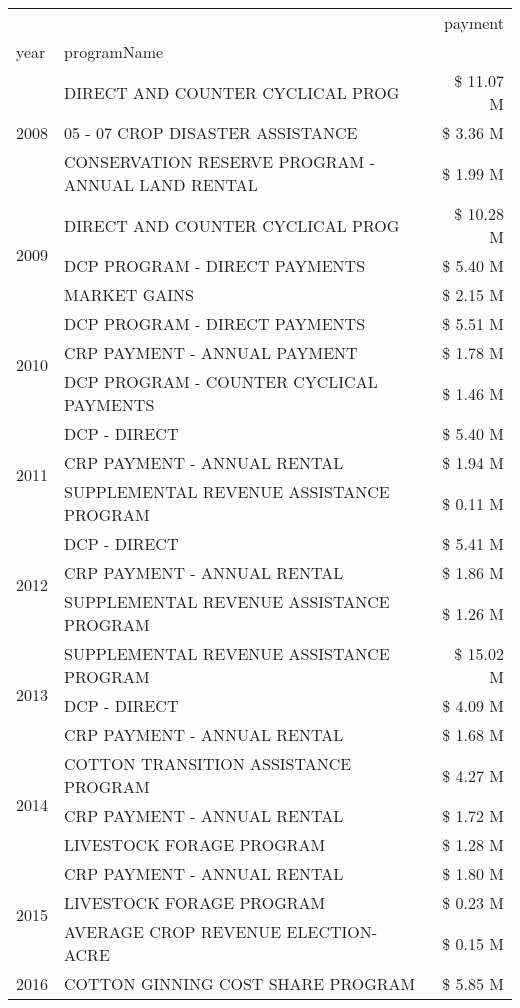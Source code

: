 \begin{tabular}{llr}
\toprule
 &  & payment \\
year & programName &  \\
\midrule
\multirow[t]{3}{*}{2008} & DIRECT AND COUNTER CYCLICAL PROG & \$ 11.07 M \\
 & 05 - 07 CROP DISASTER ASSISTANCE & \$ 3.36 M \\
 & CONSERVATION RESERVE PROGRAM - ANNUAL LAND RENTAL & \$ 1.99 M \\
\cline{1-3}
\multirow[t]{3}{*}{2009} & DIRECT AND COUNTER CYCLICAL PROG & \$ 10.28 M \\
 & DCP PROGRAM - DIRECT PAYMENTS & \$ 5.40 M \\
 & MARKET GAINS & \$ 2.15 M \\
\cline{1-3}
\multirow[t]{3}{*}{2010} & DCP PROGRAM - DIRECT PAYMENTS & \$ 5.51 M \\
 & CRP PAYMENT - ANNUAL PAYMENT & \$ 1.78 M \\
 & DCP PROGRAM - COUNTER CYCLICAL PAYMENTS & \$ 1.46 M \\
\cline{1-3}
\multirow[t]{3}{*}{2011} & DCP - DIRECT & \$ 5.40 M \\
 & CRP PAYMENT - ANNUAL RENTAL & \$ 1.94 M \\
 & SUPPLEMENTAL REVENUE ASSISTANCE PROGRAM & \$ 0.11 M \\
\cline{1-3}
\multirow[t]{3}{*}{2012} & DCP - DIRECT & \$ 5.41 M \\
 & CRP PAYMENT - ANNUAL RENTAL & \$ 1.86 M \\
 & SUPPLEMENTAL REVENUE ASSISTANCE PROGRAM & \$ 1.26 M \\
\cline{1-3}
\multirow[t]{3}{*}{2013} & SUPPLEMENTAL REVENUE ASSISTANCE PROGRAM & \$ 15.02 M \\
 & DCP - DIRECT & \$ 4.09 M \\
 & CRP PAYMENT - ANNUAL RENTAL & \$ 1.68 M \\
\cline{1-3}
\multirow[t]{3}{*}{2014} & COTTON TRANSITION ASSISTANCE PROGRAM & \$ 4.27 M \\
 & CRP PAYMENT - ANNUAL RENTAL & \$ 1.72 M \\
 & LIVESTOCK FORAGE PROGRAM & \$ 1.28 M \\
\cline{1-3}
\multirow[t]{3}{*}{2015} & CRP PAYMENT - ANNUAL RENTAL & \$ 1.80 M \\
 & LIVESTOCK FORAGE PROGRAM & \$ 0.23 M \\
 & AVERAGE CROP REVENUE ELECTION-ACRE & \$ 0.15 M \\
\cline{1-3}
\multirow[t]{3}{*}{2016} & COTTON GINNING COST SHARE PROGRAM & \$ 5.85 M \\

\end{tabular}
